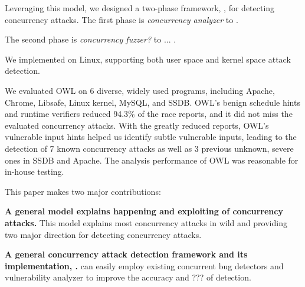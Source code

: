 Leveraging this model, we designed a two-phase framework, \xxx, for detecting concurrency attacks. 
The first phase is \emph{concurrency analyzer} to . 

The second phase is \emph{concurrency fuzzer?} to ... .

We implemented \xxx on Linux, supporting both user space and kernel space attack detection. 



We evaluated OWL on 6 diverse, widely used programs, including Apache, Chrome, Libsafe, Linux kernel, MySQL,
and SSDB. OWL’s benign schedule hints and runtime verifiers reduced 94.3\% of the race reports, 
and it did not miss the evaluated concurrency attacks. With the greatly reduced reports,
OWL’s vulnerable input hints helped us identify subtle
vulnerable inputs, leading to the detection of 7 known concurrency
attacks as well as 3 previous unknown, severe ones
in SSDB and Apache. The analysis performance of OWL was
reasonable for in-house testing.


This paper makes two major contributions:

\begin{tightenum}
\item \textbf{A general model explains happening and exploiting of concurrency attacks.} 
This model explains most concurrency attacks in wild and 
providing two major direction for detecting concurrency attacks. 
	
\item \textbf{A general concurrency attack detection framework and its implementation, \xxx.} 
\xxx can easily employ existing concurrent bug detectors and vulnerability analyzer 
to improve the accuracy and ??? of detection.
	
\end{tightenum}

 






